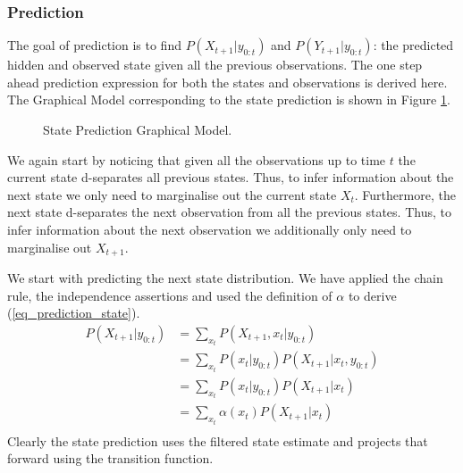 \subsubsection{Prediction}
The goal of prediction is to find $P(X_{t+1}|y_{0:t})$ and $P(Y_{t+1}|y_{0:t})$: the predicted hidden and observed state given all the previous observations. The one step ahead prediction expression for both the states and observations is derived here. The Graphical Model corresponding to the state prediction is shown in Figure \ref{fig_linmod_pred_hmm}. 
\begin{figure}[H] 
\centering
{}
\caption{State Prediction Graphical Model.}
\label{fig_linmod_pred_hmm}
\end{figure}

We again start by noticing that given all the observations  up to time $t$ the current state d-separates  all previous states. Thus, to infer information about the next state we only need to marginalise out the current state $X_t$. Furthermore, the next state d-separates the next observation from all the previous states. Thus, to infer information about the next observation we additionally only need to marginalise out $X_{t+1}$.

We start with predicting the next state distribution. We have applied the chain rule, the independence assertions and used the definition of $\alpha$ to derive (\ref{eq_prediction_state}).
\begin{equation}
\begin{aligned}
P(X_{t+1}|y_{0:t}) &= \sum_{x_t} P(X_{t+1}, x_t|y_{0:t}) \\
&= \sum_{x_t} P(x_t|y_{0:t})P(X_{t+1}|x_t, y_{0:t}) \\
&= \sum_{x_t} P(x_t|y_{0:t})P(X_{t+1}|x_t) \\
&= \sum_{x_t} \alpha(x_t)P(X_{t+1}|x_t) \\
\end{aligned}
\label{eq_prediction_state}
\end{equation}
Clearly the state prediction uses the filtered state estimate and projects that forward using the transition function.

